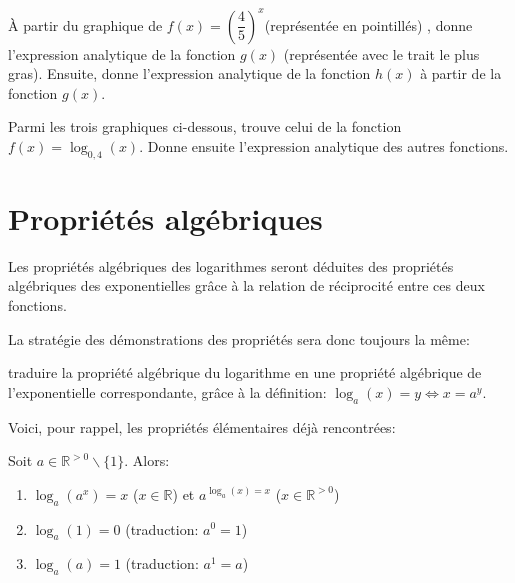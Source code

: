 \documentclass[a4paper,12pt,singlepage]{report}
\newcommand{\IR}{\mathbb{R}}
\begin{document}
\begin{exercice}
À partir du graphique de \(f(x)=\left(\dfrac{4}{5}\right)^x\)(représentée en pointillés) , donne l'expression
analytique de la fonction \(g(x)\) (représentée avec le trait le plus gras). Ensuite, donne l'expression analytique de la
fonction \(h(x)\) à partir de la fonction \(g(x)\).

\begin{center}

\end{center}
\end{exercice}

\begin{exercice}
Parmi les trois graphiques ci-dessous, trouve celui de la fonction
\(f(x)=\log_{0,4}(x)\). Donne ensuite l'expression analytique des autres
fonctions.
\begin{center}

\end{center}
\end{exercice}
\section{Propriétés algébriques}
\label{sec:org3a26d3e}

Les propriétés algébriques des logarithmes seront déduites des propriétés
algébriques des exponentielles grâce à la relation de réciprocité entre ces deux
fonctions.

La stratégie des démonstrations des propriétés sera donc toujours la même:

\begin{boite}
traduire la propriété algébrique du logarithme en une propriété algébrique de
l'exponentielle correspondante, grâce à la définition:
\(\log_a(x)=y\Leftrightarrow x=a^y\).
\end{boite}

Voici, pour rappel, les propriétés élémentaires déjà rencontrées:

\begin{propriete}
Soit \(a\in\IR^{>0}\backslash\{1\}\). Alors:
\begin{enumerate}
\item \(\log_a(a^x)=x\) (\(x\in\IR\)) et \(a^{\log_a(x)=x}\) (\(x\in\IR^{>0}\))
\item \(\log_a(1)=0\)  (traduction: \(a^0=1\))
\item \(\log_a(a)=1\)  (traduction: \(a^1=a\))
\end{enumerate}
\end{propriete}
\end{document}
